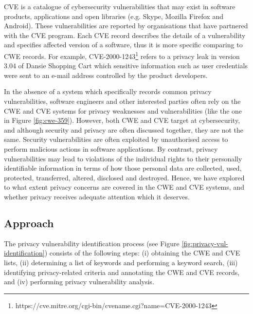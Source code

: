 CVE is a catalogue of cybersecurity vulnerabilities that may exist in software products, applications and open libraries (e.g. Skype, Mozilla Firefox and Android). These vulnerabilities are reported by organisations that have partnered with the CVE program. Each CVE record describes the details of a vulnerability and specifies affected version of a software, thus it is more specific comparing to CWE records. For example, CVE-2000-1243\footnote{https://cve.mitre.org/cgi-bin/cvename.cgi?name=CVE-2000-1243} refers to a privacy leak in version 3.04 of Dansie Shopping Cart which sensitive information such as user credentials were sent to an e-mail address controlled by the product developers.

In the absence of a system which specifically records common privacy vulnerabilities, software engineers and other interested parties often rely on the CWE and CVE systems for privacy weaknesses and vulnerabilities (like the one in Figure \ref{fig:cwe-359}). However, both CWE and CVE target at cybersecurity, and although security and privacy are often discussed together, they are not the same. Security vulnerabilities are often exploited by unauthorised access to perform malicious actions in software applications. By contrast, privacy vulnerabilities may lead to violations of the individual rights to their personally identifiable information in terms of how those personal data are collected, used, protected, transferred, altered, disclosed and destroyed. Hence, we have explored to what extent privacy concerns are covered in the CWE and CVE systems, and whether privacy receives adequate attention which it deserves.

\subsection{Approach}

The privacy vulnerability identification process (see Figure \ref{fig:privacy-vul-identification}) consists of the following steps: (i) obtaining the CWE and CVE lists, (ii) determining a list of keywords and performing a keyword search, (iii) identifying privacy-related criteria and annotating the CWE and CVE records, and (iv) performing privacy vulnerability analysis.

